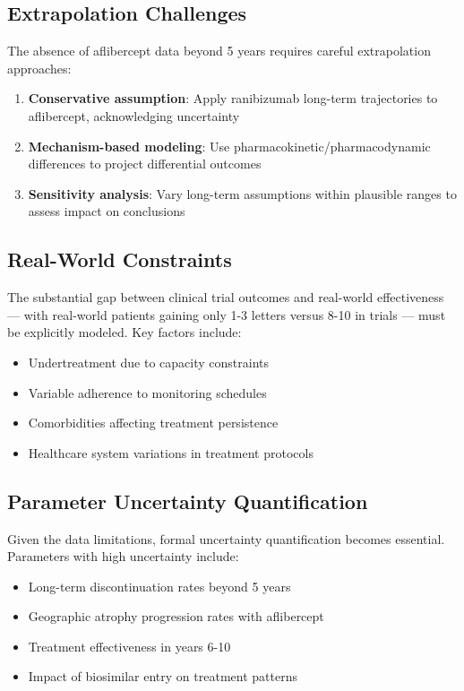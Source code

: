 \subsection{Extrapolation Challenges}

The absence of aflibercept data beyond 5 years requires careful extrapolation approaches:

\begin{enumerate}
    \item \textbf{Conservative assumption}: Apply ranibizumab long-term trajectories to aflibercept, acknowledging uncertainty
    \item \textbf{Mechanism-based modeling}: Use pharmacokinetic/pharmacodynamic differences to project differential outcomes
    \item \textbf{Sensitivity analysis}: Vary long-term assumptions within plausible ranges to assess impact on conclusions
\end{enumerate}

\subsection{Real-World Constraints}

The substantial gap between clinical trial outcomes and real-world effectiveness — with real-world patients gaining only 1-3 letters versus 8-10 in trials — must be explicitly modeled. Key factors include:

\begin{itemize}
    \item Undertreatment due to capacity constraints
    \item Variable adherence to monitoring schedules
    \item Comorbidities affecting treatment persistence
    \item Healthcare system variations in treatment protocols
\end{itemize}

\subsection{Parameter Uncertainty Quantification}

Given the data limitations, formal uncertainty quantification becomes essential. Parameters with high uncertainty include:

\begin{itemize}
    \item Long-term discontinuation rates beyond 5 years
    \item Geographic atrophy progression rates with aflibercept
    \item Treatment effectiveness in years 6-10
    \item Impact of biosimilar entry on treatment patterns
\end{itemize}

